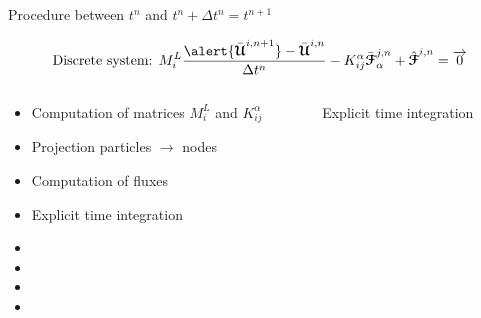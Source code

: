 \begin{frame}{Procedure between $t^n$ and $t^n + \Delta t^n=t^{n+1}$}
  \begin{footnotesize}
    \begin{equation*}
      \text{Discrete system: }M^L_{i} \frac{\alert{\bar{\Ucb}^{i,n+1}} - \bar{\Ucb}^{i,n}}{\Delta t^n}  - K_{ij}^\alpha \bar{\Fcb}^{j,n}_{\alpha}  + \hat{\Fcb}^{i,n}=  \vect{0}
    \end{equation*}
    \begin{columns}
      \begin{column}{0.4\textwidth}
        \begin{itemize}
        \item[(1)] Computation of matrices $M_i^L$ and $K_{ij}^\alpha$
        \item[(2)] Projection particles $\rightarrow$ nodes
        \item[(3)] Computation of fluxes
        \item[(4)] Explicit time integration
        \item[]
        \item[]
        \item[]
        \item[]
        \end{itemize}
      \end{column}
      \vrule{}
      \begin{column}{0.6\textwidth}
        \begin{block}{Explicit time integration}
          
                

\end{block}
\end{column}
\end{columns}
\end{footnotesize}
\end{frame}
